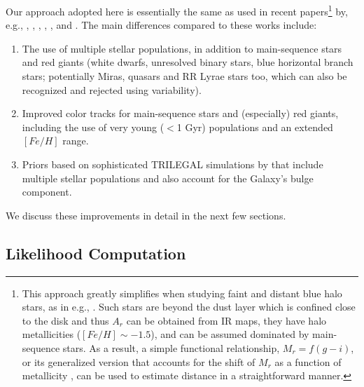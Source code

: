 Our approach adopted here is essentially the same as used in recent papers\footnote{This approach greatly simplifies when studying
faint and distant blue halo stars, as in e.g., \cite{2008ApJ...673..864J}. Such stars are beyond the dust layer which is confined close
to the disk and thus $A_r$ can be obtained from IR maps, they have halo metallicities ($[Fe/H] \sim -1.5$), and can be assumed dominated
by main-sequence stars. As a result, a simple functional relationship, $M_r = f(g-i)$, or its generalized version that
accounts for the shift of $M_r$ as a function of metallicity \citep{2008ApJ...684..287I}, can be used to estimate distance
in a straightforward manner.}
by, e.g., \cite{2011MNRAS.411..435B},  \cite{2014ApJ...783..114G}, \cite{lallement_3d_2014}, 
\cite{gordon_panchromatic_2016}, \cite{queiroz_starhorse_2018}, \cite{green_3d_2019} and \cite{bailer-jones_estimating_2021}.
The main differences compared to these works include: 
\begin{enumerate}
\item The use of multiple stellar populations, in addition to main-sequence stars and red giants (white dwarfs, unresolved binary stars,
                blue horizontal branch stars; potentially Miras, quasars and RR Lyrae stars too, which can also be recognized and rejected using variability).
\item Improved color tracks for main-sequence stars and (especially) red giants, including the use of very young ($<$1 Gyr) populations 
               and an extended $[Fe/H]$ range. 
\item Priors based on sophisticated TRILEGAL simulations by \cite{2022ApJS..262...22D} that include multiple stellar populations and
               also account for the Galaxy's bulge component. 
\end{enumerate}
             
We discuss these improvements in detail in the next few sections. 


\subsection{Likelihood Computation}

